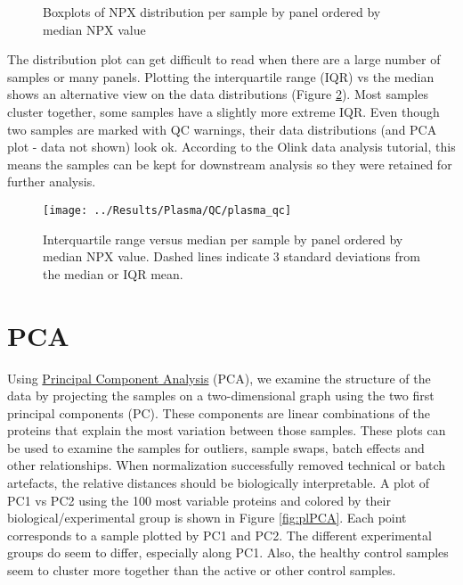 \documentclass[
]{book}
\begin{document}
\begin{figure}

{\centering {}

}

\caption{Boxplots of NPX distribution per sample by panel ordered by median NPX value}\label{fig:plDistrBox}
\end{figure}

The distribution plot can get difficult to read when there are a large number
of samples or many panels. Plotting the interquartile range (IQR) vs the median
shows an alternative view on the data distributions (Figure \ref{fig:plIQR}).
Most samples cluster together, some samples have a slightly more extreme IQR.
Even though two samples are marked with QC warnings, their data distributions
(and PCA plot - data not shown) look ok. According to the Olink data analysis
tutorial, this means the samples can be kept for downstream analysis so they
were retained for further analysis.

\begin{figure}

{\centering \texttt{[image: ../Results/Plasma/QC/plasma\_qc]} 

}

\caption{Interquartile range versus median per sample by panel ordered by median NPX value. Dashed lines indicate 3 standard deviations from the median or IQR mean.}\label{fig:plIQR}
\end{figure}

\hypertarget{pca}{%
\section{PCA}\label{pca}}

Using \href{http://setosa.io/ev/principal-component-analysis}{Principal Component
Analysis} (PCA), we examine
the structure of the data by projecting the samples on a two-dimensional graph
using the two first principal components (PC). These components are linear
combinations of the proteins that explain the most variation between those
samples. These plots can be used to examine the samples for outliers, sample
swaps, batch effects and other relationships. When normalization successfully
removed technical or batch artefacts, the relative distances should be
biologically interpretable. A plot of PC1 vs PC2 using the 100 most variable
proteins and colored by their biological/experimental group is shown in Figure
\ref{fig:plPCA}. Each point corresponds to a sample plotted by PC1 and PC2.
The different experimental groups do seem to differ, especially along PC1.
Also, the healthy control samples seem to cluster more together than the active
or other control samples.
\end{document}
